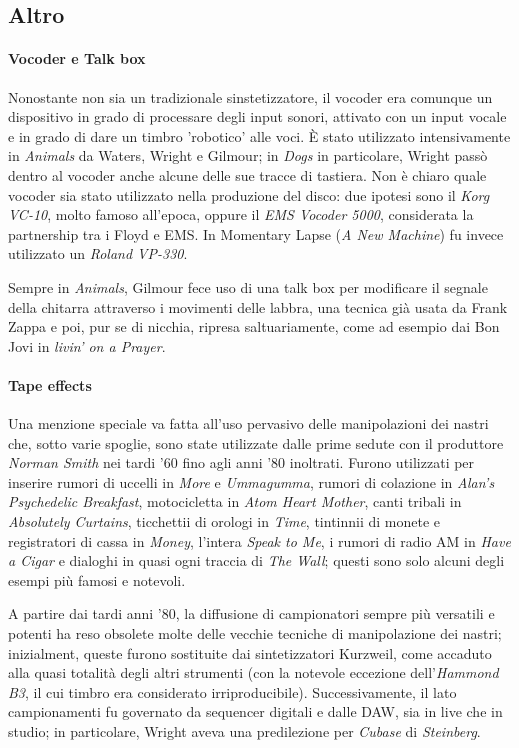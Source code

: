 \documentclass[class=book, crop=false, oneside, 12pt]{standalone}
\begin{document}
    \subsection{Altro}
    \paragraph{Vocoder e Talk box}
    Nonostante non sia un tradizionale sinstetizzatore, il vocoder era comunque un dispositivo in grado di processare degli input sonori, attivato con un input vocale e in grado di dare un timbro 'robotico' alle voci. È stato utilizzato intensivamente in \emph{Animals} da Waters, Wright e Gilmour; in \emph{Dogs} in particolare, Wright passò dentro al vocoder anche alcune delle sue tracce di tastiera. Non è chiaro quale vocoder sia stato utilizzato nella produzione del disco: due ipotesi sono il \emph{Korg VC-10}, molto famoso all'epoca, oppure il \emph{EMS Vocoder 5000}, considerata la partnership tra i Floyd e EMS. In Momentary Lapse (\emph{A New Machine}) fu invece utilizzato un \emph{ Roland VP-330}.

    Sempre in \emph{Animals}, Gilmour fece uso di una talk box per modificare il segnale della chitarra attraverso i movimenti delle labbra, una tecnica già usata da Frank Zappa e poi, pur se di nicchia, ripresa saltuariamente, come ad esempio dai Bon Jovi in \emph{livin' on a Prayer}.

    \paragraph{Tape effects}
    Una menzione speciale va fatta all'uso pervasivo delle manipolazioni dei nastri che, sotto varie spoglie, sono state utilizzate dalle prime sedute con il produttore \emph{Norman Smith} nei tardi '60 fino agli anni '80 inoltrati. Furono utilizzati per inserire rumori di uccelli in \emph{More} e \emph{Ummagumma}, rumori di colazione in \emph{Alan's Psychedelic Breakfast}, motocicletta in \emph{Atom Heart Mother}, canti tribali in \emph{Absolutely Curtains}, ticchettii di orologi in \emph{Time}, tintinnii di monete e registratori di cassa in \emph{Money}, l'intera \emph{Speak to Me}, i rumori di radio AM in \emph{Have a Cigar} e dialoghi in quasi ogni traccia di \emph{The Wall}; questi sono solo alcuni degli esempi più famosi e notevoli. 

    A partire dai tardi anni '80, la diffusione di campionatori sempre più versatili e potenti ha reso obsolete molte delle vecchie tecniche di manipolazione dei nastri; inizialment, queste furono sostituite dai sintetizzatori Kurzweil, come accaduto alla quasi totalità degli altri strumenti (con la notevole eccezione dell'\emph{Hammond B3}, il cui timbro era considerato irriproducibile). Successivamente, il lato campionamenti fu governato da sequencer digitali e dalle DAW, sia in live che in studio; in particolare, Wright aveva una predilezione per \emph{Cubase} di \emph{Steinberg}.
\end{document}
